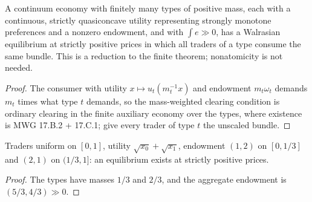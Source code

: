 \begin{theorem}
\label{thm:continuum_existence_types}
\leanok
{}
A continuum economy with finitely many types of positive mass, each with a continuous, strictly quasiconcave utility
representing strongly monotone preferences and a nonzero endowment, and with $\int e \gg 0$, has a Walrasian equilibrium at
strictly positive prices in which all traders of a type consume the same bundle. This is a reduction to the finite
theorem; nonatomicity is not needed.
\end{theorem}
\begin{proof}
\leanok
The consumer with utility $x \mapsto u_t(m_t^{-1}x)$ and endowment $m_t \omega_t$ demands $m_t$ times what type $t$ demands,
so the mass-weighted clearing condition is ordinary clearing in the finite auxiliary economy over the types, where existence
is MWG 17.B.2 + 17.C.1; give every trader of type $t$ the unscaled bundle.
\end{proof}

\begin{theorem}[Witness]
\label{thm:continuum_existence_witness}
\leanok
{}
Traders uniform on $[0,1]$, utility $\sqrt{x_0} + \sqrt{x_1}$, endowment $(1,2)$ on $[0,1/3]$ and $(2,1)$ on $(1/3,1]$: an
equilibrium exists at strictly positive prices.
\end{theorem}
\begin{proof}
\leanok
The types have masses $1/3$ and $2/3$, and the aggregate endowment is $(5/3, 4/3) \gg 0$.
\end{proof}

